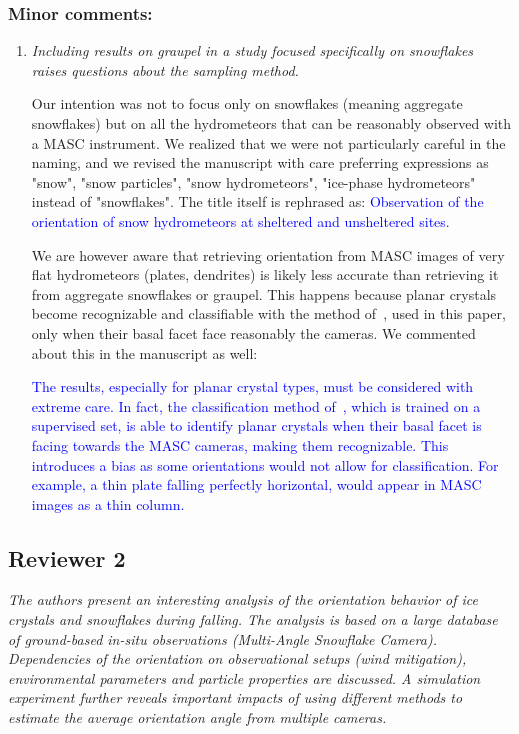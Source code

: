 \documentclass[12pt]{article}
\newcommand*{\blue}{\textcolor{blue}}
\begin{document}
\subsubsection*{Minor comments:}
\begin{enumerate}
    \item \textit{Including results on graupel in a study focused specifically on snowflakes raises questions about the sampling method.}

    Our intention was not to focus only on snowflakes (meaning aggregate snowflakes) but on all the hydrometeors that can be reasonably observed with a MASC instrument. We realized that we were not particularly careful in the naming, and we revised the manuscript with care preferring expressions as "snow", "snow particles", "snow hydrometeors", "ice-phase hydrometeors" instead of "snowflakes". The title itself is rephrased as: \blue{Observation of the orientation  of snow hydrometeors at sheltered and unsheltered sites}.

    We are however aware that retrieving orientation from MASC images of very flat hydrometeors (plates, dendrites) is likely less accurate than retrieving it from aggregate snowflakes or graupel. This happens because planar crystals become recognizable and classifiable with the method of~\cite{Praz_AMT_2017}, used in this paper, only when their basal facet face reasonably the cameras. We commented about this in the manuscript as well:
    
    \blue{The results, especially for planar crystal types, must be considered with extreme care. In fact, the classification method of~\cite{Praz_AMT_2017}, which is trained on a supervised set, is able to identify planar crystals when their basal facet is facing towards the MASC cameras, making them recognizable.  This introduces a bias as some orientations would not allow for classification. For example, a thin plate falling perfectly horizontal, would appear in MASC images as a thin column. }
\end{enumerate}

\clearpage
\subsection*{Reviewer 2}
\textit{The authors present an interesting analysis of the orientation behavior of ice crystals and snowflakes during falling. The analysis is based on a large database of ground-based in-situ observations (Multi-Angle Snowflake Camera). Dependencies of the orientation on observational setups (wind mitigation), environmental parameters and particle properties are discussed. A simulation experiment further reveals important impacts of using different methods to estimate the average orientation angle from multiple cameras.}\\
\end{document}

